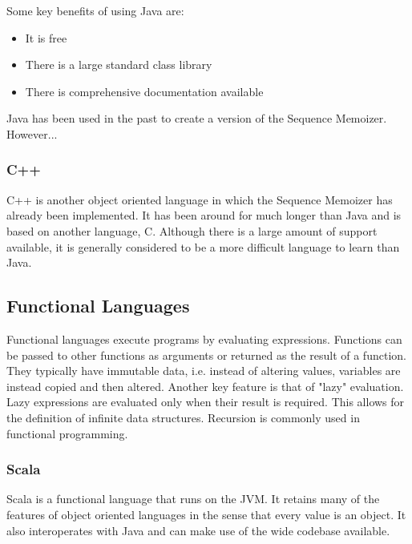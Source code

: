 Some key benefits of using Java are:

\begin{itemize}

\item It is free
\item There is a large standard class library
\item There is comprehensive documentation available 

\end{itemize}

Java has been used in the past to create a version of the Sequence Memoizer. However...



\subsubsection{C++}

C++ is another object oriented language in which the Sequence Memoizer has already been implemented. It has been around for much longer than Java and is based on another language, C. Although there is a large amount of support available, it is generally considered to be a more difficult language to learn than Java.


\subsection{Functional Languages}

Functional languages execute programs by evaluating expressions. Functions can be passed to other functions as arguments or returned as the result of a function. They typically have immutable data, i.e. instead of altering values, variables are instead copied and then altered. Another key feature is that of "lazy" evaluation. Lazy expressions are evaluated only when their result is required. This allows for the definition of infinite data structures. Recursion is commonly used in functional programming. 

\subsubsection{Scala}

Scala is a functional language that runs on the JVM. It retains many of the features of object oriented languages in the sense that every value is an object. It also interoperates with Java and can make use of the wide codebase available.

